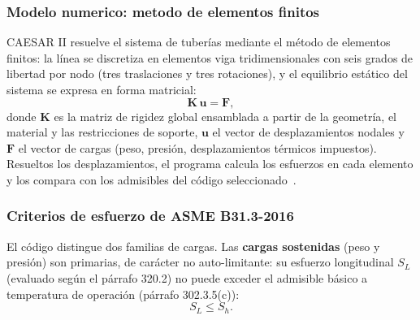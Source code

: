 \subsubsection{Modelo numerico: metodo de elementos finitos}

CAESAR II resuelve el sistema de tuber\'{i}as mediante el m\'{e}todo de elementos
finitos: la l\'{i}nea se discretiza en elementos viga tridimensionales con seis
grados de libertad por nodo (tres traslaciones y tres rotaciones), y el equilibrio
est\'{a}tico del sistema se expresa en forma matricial:
\begin{equation}
    \mathbf{K} \, \mathbf{u} = \mathbf{F},
    \label{eq:fem}
\end{equation}
donde $\mathbf{K}$ es la matriz de rigidez global ensamblada a partir de la
geometr\'{i}a, el material y las restricciones de soporte, $\mathbf{u}$ el vector
de desplazamientos nodales y $\mathbf{F}$ el vector de cargas (peso, presi\'{o}n,
desplazamientos t\'{e}rmicos impuestos). Resueltos los desplazamientos, el
programa calcula los esfuerzos en cada elemento y los compara con los
admisibles del c\'{o}digo seleccionado~\cite{caesar2_ug_2019}.

\subsubsection{Criterios de esfuerzo de ASME B31.3-2016}

El c\'{o}digo distingue dos familias de cargas. Las \textbf{cargas sostenidas}
(peso y presi\'{o}n) son primarias, de car\'{a}cter no auto-limitante: su esfuerzo
longitudinal $S_L$ (evaluado seg\'{u}n el p\'{a}rrafo 320.2) no puede exceder el
admisible b\'{a}sico a temperatura de operaci\'{o}n (p\'{a}rrafo 302.3.5(c)):
\begin{equation}
    S_L \leq S_h.
    \label{eq:sl}
\end{equation}

